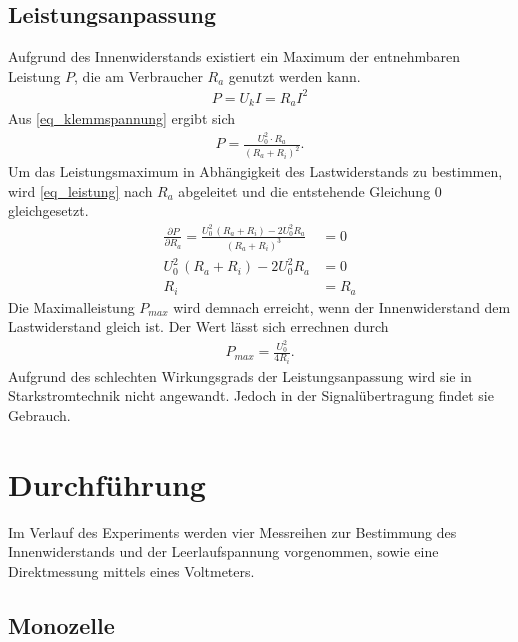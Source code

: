 \subsection{Leistungsanpassung}
Aufgrund des Innenwiderstands existiert ein Maximum der entnehmbaren Leistung $P$, die am Verbraucher $R_a$ genutzt werden kann.
\begin{align}
 P = U_k I = R_a I^2
\end{align}
Aus \eqref{eq_klemmspannung} ergibt sich
\begin{align}
 P = \frac{U^2_0\cdot R_a}{(R_a+R_i)^2}.
 \label{eq_leistung}
\end{align}
Um das Leistungsmaximum in Abhängigkeit des Lastwiderstands zu bestimmen, wird \eqref{eq_leistung} nach $R_a$ abgeleitet und die 
entstehende Gleichung 0 gleichgesetzt.
\begin{align}
 \nonumber
 \frac{\partial P}{\partial R_a} = \frac{U^2_0\,(R_a+R_i)-2U^2_0R_a}{(R_a+R_i)^3}&=0\\
 \nonumber
 U^2_0\,(R_a+R_i)-2U^2_0R_a&=0\\
 R_i &= R_a
\end{align}
Die Maximalleistung $P_{max}$ wird demnach erreicht, wenn der Innenwiderstand dem Lastwiderstand gleich ist. Der Wert lässt sich errechnen
durch 
\begin{align}
 P_{max} = \frac{U^2_0}{4R_i}.
 \label{eq_maxleistung}
\end{align}
Aufgrund des schlechten Wirkungsgrads der Leistungsanpassung wird sie in Starkstromtechnik nicht angewandt. Jedoch in der Signalübertragung
findet sie Gebrauch.

\section{Durchführung}
Im Verlauf des Experiments werden vier Messreihen zur Bestimmung des Innenwiderstands und der Leerlaufspannung vorgenommen, sowie eine
Direktmessung mittels eines Voltmeters.
\subsection{Monozelle}

